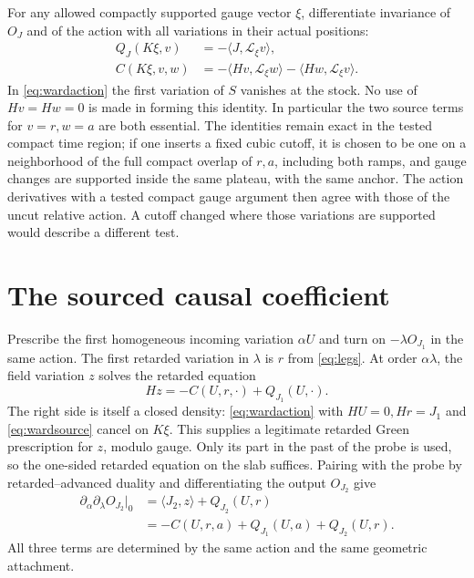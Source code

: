 \documentclass[11pt]{article}
\newcommand{\Lie}{\mathcal L}
\numberwithin{equation}{section}
\begin{document}
For any allowed compactly supported gauge vector \(\xi\),
differentiate invariance of \(O_J\) and of the action with
all variations in their actual positions:
\begin{align}
 Q_J(K\xi,v)&=-\langle J,\Lie_\xi v\rangle ,
                                  \label{eq:wardsource}\\
 C(K\xi,v,w)&=-\langle Hv,\Lie_\xi w\rangle
                    -\langle Hw,\Lie_\xi v\rangle .
                                  \label{eq:wardaction}
\end{align}
In \eqref{eq:wardaction} the first variation of \(S\)
vanishes at the stock. No use of \(Hv=Hw=0\) is made
in forming this identity. In particular the two source
terms for \(v=r,w=a\) are both essential. The identities
remain exact in the tested compact time region; if one
inserts a fixed cubic cutoff, it is chosen to be one on
a neighborhood of the full compact overlap of \(r,a\),
including both ramps, and gauge changes are supported
inside the same plateau, with the same anchor.
The action derivatives with a tested compact gauge
argument then agree with those of the uncut
relative action. A cutoff changed where those variations
are supported would describe a different test.

\section{The sourced causal coefficient}

Prescribe the first homogeneous incoming variation
\(\alpha U\) and turn on \(-\lambda O_{J_1}\) in the
same action. The first retarded variation in \(\lambda\)
is \(r\) from \eqref{eq:legs}. At order
\(\alpha\lambda\), the field variation \(z\) solves the
retarded equation
\begin{equation}
 Hz=-C(U,r,\cdot)+Q_{J_1}(U,\cdot).
 \label{eq:z}
\end{equation}
The right side is itself a closed density:
\eqref{eq:wardaction} with \(HU=0,Hr=J_1\) and
\eqref{eq:wardsource} cancel on \(K\xi\).
This supplies a legitimate retarded Green prescription for
\(z\), modulo gauge. Only its part in the past of the probe
is used, so the one-sided retarded equation on the slab
suffices. Pairing with the probe by retarded--advanced
duality and differentiating the output \(O_{J_2}\) give
\begin{align}
 \partial_\alpha\partial_\lambda O_{J_2}\big|_0
 &=\langle J_2,z\rangle+Q_{J_2}(U,r)\nonumber\\
 &=-C(U,r,a)+Q_{J_1}(U,a)+Q_{J_2}(U,r).
 \label{eq:derivation}
\end{align}
All three terms are determined by the same action and
the same geometric attachment.
\end{document}

